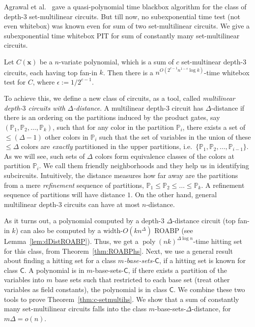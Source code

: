\documentclass[final,oneeqnum, onethmnum, onefignum]{siamltex1213}
\renewcommand{\P}{\mathbb P}
\newcommand{\di}{\Delta} %
\newcommand{\lis}[3]{{#1}_1 #2 {#1}_2 #2\dots #2 {#1}_{#3}}
\DeclareMathOperator{\poly}{poly}
\begin{document}
Agrawal et al.\ \cite{ASS13} gave a quasi-polynomial time blackbox 
algorithm for the class of depth-$3$ set-multilinear circuits.  
But till now, no subexponential time test (not even whitebox) was known even for sum of two 
set-multilinear circuits.
We give a subexponential time whitebox PIT for sum of constantly many
set-multilinear circuits.

\begin{theorem}
\label{thm:c-setmultihs}
Let $C(\mathbf{x})$ be a $n$-variate polynomial, which is a sum of $c$ 
set-multinear depth-$3$ circuits, each having top fan-in $k$. 
Then there is a $n^{O(2^{c-1} n^{1 - \epsilon} \log k) }$-time whitebox test for $C$,
where $\epsilon := 1/2^{c-1}$.
\end{theorem}

To achieve this, we define a new class of circuits, as a tool, called
{\em multilinear depth-$3$ circuits
with $\di$-distance}. 
A multilinear depth-$3$ circuit has $\di$-distance
if there is an ordering 
on the partitions induced by the product gates, 
say $(\lis{\P}{,}{k})$, such that for any color 
in the partition $\P_i$, there exists a set of $\le (\di-1)$ 
other colors in $\P_i$ such that the set of variables in 
the union of these $\le \di$ colors are {\em exactly} partitioned
in the upper partitions, i.e.\ $\{\lis{\P}{,}{i-1}\}$.
As we will see,
such sets of $\di$ colors form equivalence classes of the colors at partition $\P_i$.
We call them friendly neighborhoods and
they help us in identifying subcircuits.
Intuitively, the distance measures how far away are the partitions 
from a mere \emph{refinement} sequence of partitions, $\lis{\P}{\le}{k}$.
A refinement sequence of partitions will have distance $1$.
On the other hand, general multilinear depth-$3$ circuits can have at most
$n$-distance.

As it turns out, a polynomial computed by a depth-$3$ $\di$-distance
circuit (top fan-in $k$) can also be computed by a width-$O(kn^{\di})$ ROABP
(see Lemma~\ref{lem:dDistROABP}).
Thus, we get a $\poly(nk)^{\di \log n}$-time hitting set for this class,
 from Theorem~\ref{thm:ROABPhs}.
Next, we use a general result about finding a hitting set for a class
{\em $m$-base-sets-$\mathsf{C}$}, 
if a hitting set is known for class $\mathsf{C}$.
A polynomial is in $m$-base-sets-$\mathsf{C}$,
if there exists a partition of the variables into $m$ base sets
such that restricted to each base set (treat other variables as field constants), 
the polynomial is in class $\mathsf{C}$.
We combine these two tools to prove Theorem~\ref{thm:c-setmultihs}.
We show that a sum of constantly many set-multilinear circuits 
falls into the class $m$-base-sets-$\di$-distance, for $m \di = o(n)$.
\end{document}
